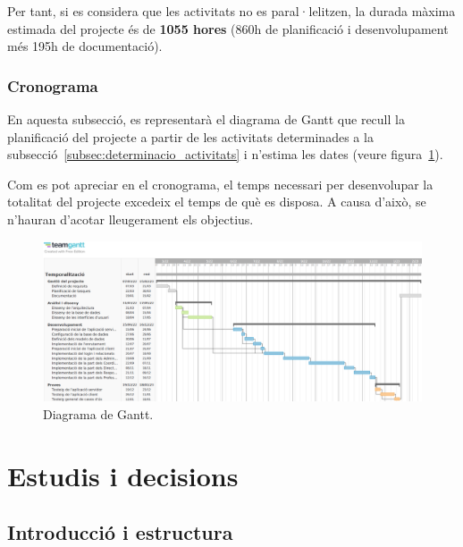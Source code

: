 \documentclass[a4paper,12pt]{ThesisStyle}
\begin{document}
Per tant, si es considera que les activitats no es paral·lelitzen, la durada màxima estimada del projecte és de \textbf{1055 hores} (860h de planificació i desenvolupament més 195h de documentació).

\newpage

\begin{landscape}

\subsection{Cronograma}
\label{subsec:cronograma}

En aquesta subsecció, es representarà el diagrama de Gantt que recull la planificació del projecte a partir de les activitats determinades a la subsecció~\ref{subsec:determinacio_activitats} i n'estima les dates (veure figura~\ref{img:diagrama_gantt}).

Com es pot apreciar en el cronograma, el temps necessari per desenvolupar la totalitat del projecte excedeix el temps de què es disposa. A causa d'això, se n'hauran d'acotar lleugerament els objectius.

\begin{figure}[H]
  \centering
  \includegraphics[width=1.5\textwidth]{assets/planification_figs/ganttDiagram.png}
  \caption{\label{img:diagrama_gantt}Diagrama de Gantt.}
\end{figure}

\end{landscape}

\chapter{Estudis i decisions}
\label{cap:estudi}

\section{Introducció i estructura}
\label{sec:estudi_intro}
\end{document}
